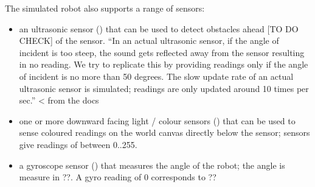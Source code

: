 \documentclass[letterpaper,10pt,english]{sphinxmanual}
\begin{document}
The simulated robot also supports a range of sensors:
\begin{itemize}
\item {} 
an ultrasonic sensor () that can be used to detect obstacles ahead {[}TO DO \sphinxhyphen{} CHECK{]} of the sensor. “In an actual ultrasonic sensor, if the angle of incident is too steep, the sound gets reflected away from the sensor resulting in no reading. We try to replicate this by providing readings only if the angle of incident is no more than 50 degrees. The slow update rate of an actual ultrasonic sensor is simulated; readings are only updated around 10 times per sec.” \textless{}\sphinxhyphen{} from the
docs

\item {} 
one or more downward facing light / colour sensors () that can be used to sense coloured readings on the world canvas directly below the sensor; sensors give readings of between 0..255.

\item {} 
a gyroscope sensor () that measures the angle of the robot; the angle is measure in ??. A gyro reading of 0 corresponds to ??

\end{itemize}
\end{document}
